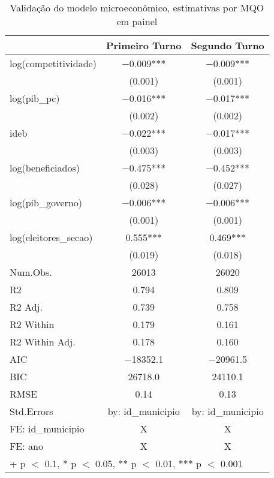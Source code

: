 \begin{table}
\label{feols}
\caption{Validação do modelo microeconômico, estimativas por MQO em painel}
\centering{}
\begin{tabular}[t]{lcc}
\toprule
  & Primeiro Turno & Segundo Turno\\
\midrule
log(competitividade) & \num{-0.009}*** & \num{-0.009}***\\
 & (\num{0.001}) & \vphantom{1} (\num{0.001})\\
log(pib\_pc) & \num{-0.016}*** & \num{-0.017}***\\
 & (\num{0.002}) & (\num{0.002})\\
ideb & \num{-0.022}*** & \num{-0.017}***\\
 & (\num{0.003}) & (\num{0.003})\\
log(beneficiados) & \num{-0.475}*** & \num{-0.452}***\\
 & (\num{0.028}) & (\num{0.027})\\
log(pib\_governo) & \num{-0.006}*** & \num{-0.006}***\\
 & (\num{0.001}) & (\num{0.001})\\
log(eleitores\_secao) & \num{0.555}*** & \num{0.469}***\\
 & (\num{0.019}) & (\num{0.018})\\
\midrule
Num.Obs. & \num{26013} & \num{26020}\\
R2 & \num{0.794} & \num{0.809}\\
R2 Adj. & \num{0.739} & \num{0.758}\\
R2 Within & \num{0.179} & \num{0.161}\\
R2 Within Adj. & \num{0.178} & \num{0.160}\\
AIC & \num{-18352.1} & \num{-20961.5}\\
BIC & \num{26718.0} & \num{24110.1}\\
RMSE & \num{0.14} & \num{0.13}\\
Std.Errors & by: id\_municipio & by: id\_municipio\\
FE: id\_municipio & X & X\\
FE: ano & X & X\\
\bottomrule
\multicolumn{3}{l}{\rule{0pt}{1em}+ p $<$ 0.1, * p $<$ 0.05, ** p $<$ 0.01, *** p $<$ 0.001}\\
\end{tabular}
\end{table}
